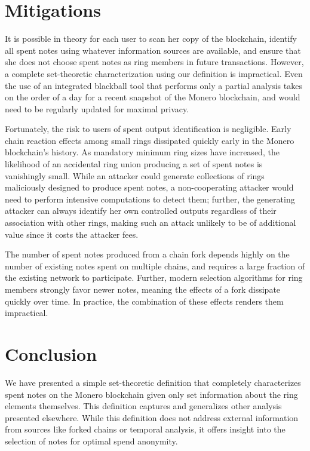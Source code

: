 \documentclass{mrl}
\begin{document}
\section{Mitigations}
It is possible in theory for each user to scan her copy of the blockchain, identify all spent notes using whatever information sources are available, and ensure that she does not choose spent notes as ring members in future transactions. However, a complete set-theoretic characterization using our definition is impractical. Even the use of an integrated blackball tool that performs only a partial analysis takes on the order of a day for a recent snapshot of the Monero blockchain, and would need to be regularly updated for maximal privacy.

Fortunately, the risk to users of spent output identification is negligible. Early chain reaction effects among small rings dissipated quickly early in the Monero blockchain's history. As mandatory minimum ring sizes have increased, the likelihood of an accidental ring union producing a set of spent notes is vanishingly small. While an attacker could generate collections of rings maliciously designed to produce spent notes, a non-cooperating attacker would need to perform intensive computations to detect them; further, the generating attacker can always identify her own controlled outputs regardless of their association with other rings, making such an attack unlikely to be of additional value since it costs the attacker fees.

The number of spent notes produced from a chain fork depends highly on the number of existing notes spent on multiple chains, and requires a large fraction of the existing network to participate. Further, modern selection algorithms for ring members strongly favor newer notes, meaning the effects of a fork dissipate quickly over time. In practice, the combination of these effects renders them impractical.

\section{Conclusion}
We have presented a simple set-theoretic definition that completely characterizes spent notes on the Monero blockchain given only set information about the ring elements themselves. This definition captures and generalizes other analysis presented elsewhere. While this definition does not address external information from sources like forked chains or temporal analysis, it offers insight into the selection of notes for optimal spend anonymity.
\end{document}
